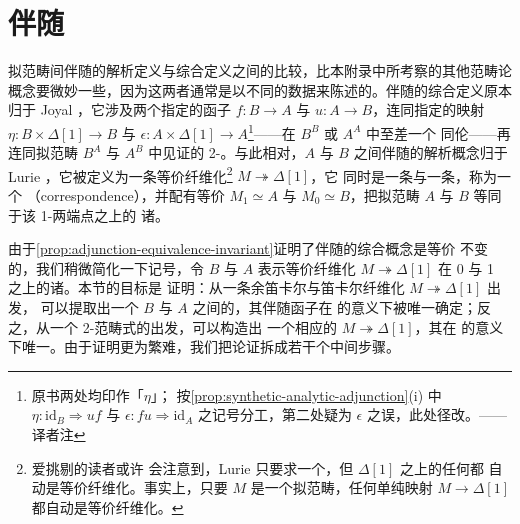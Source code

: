 
\providecommand{\QCat}{\mathcal{Q}\mathit{Cat}}%
\providecommand{\hQCat}{\mathfrak{h}\QCat}%
\providecommand{\Hom}{\operatorname{Hom}}%

\section{伴随}\label{sec:f-adjunctions}

拟范畴间伴随的解析定义与综合定义之间的比较，比本附录中所考察的其他范畴论
概念要微妙一些，因为这两者通常是以不同的数据来陈述的。伴随的综合定义原本
归于 Joyal \cite{bib63}，它涉及两个指定的函子 $f\colon B\to A$ 与
$u\colon A\to B$，连同指定的映射 $\eta\colon B\times\Delta[1]\to B$ 与
$\epsilon\colon A\times\Delta[1]\to A$\footnote{原书两处均印作「$\eta$」；
按\cref{prop:synthetic-analytic-adjunction}(i) 中 $\eta\colon\mathrm{id}_{B}\Rightarrow uf$
与 $\epsilon\colon fu\Rightarrow\mathrm{id}_{A}$ 之记号分工，第二处疑为
$\epsilon$ 之误，此处径改。——译者注}——在 $B^{B}$ 或 $A^{A}$ 中至差一个
同伦——再连同拟范畴 $B^{A}$ 与 $A^{B}$ 中见证\trTriangleEqualities{}的
2-\trSimplex{}。与此相对，$A$ 与 $B$ 之间伴随的解析概念归于 Lurie
\cite[5.2.2.1]{bib78}，它被定义为一条等价纤维化\footnote{爱挑剔的读者或许
会注意到，Lurie 只要求一个\trInnerFibration，但 $\Delta[1]$ 之上的任何\trInnerFibration{}都
自动是等价纤维化。事实上，只要 $M$ 是一个拟范畴，任何单纯映射
$M\to\Delta[1]$ 都自动是等价纤维化。} $M\twoheadrightarrow\Delta[1]$，它
同时是一条\trCartesianFibration{}与一条\trCocartesianFibration，称为一个
\textbf{\trCorrespondence}（correspondence），并配有等价 $M_{1}\simeq A$ 与
$M_{0}\simeq B$，把拟范畴 $A$ 与 $B$ 等同于该 1-\trSimplex{}两端点之上的
诸\trFiber。

由于\cref{prop:adjunction-equivalence-invariant}证明了伴随的综合概念是等价
不变的，我们稍微简化一下记号，令 $B$ 与 $A$ 表示等价纤维化
$M\twoheadrightarrow\Delta[1]$ 在 0 与 1 之上的诸\trFiber。本节的目标是
证明：从一条余笛卡尔与笛卡尔纤维化 $M\twoheadrightarrow\Delta[1]$ 出发，
可以提取出一个 $B$ 与 $A$ 之间的\trAdjunction，其伴随函子在\trIsomorphism{}%
的意义下被唯一确定；反之，从一个 2-范畴式的\trAdjunction{}出发，可以构造出
一个相应的\trCorrespondence{} $M\twoheadrightarrow\Delta[1]$，其在\trFiberedEquivalence{}%
的意义下唯一。由于证明更为繁难，我们把论证拆成若干个中间步骤。

